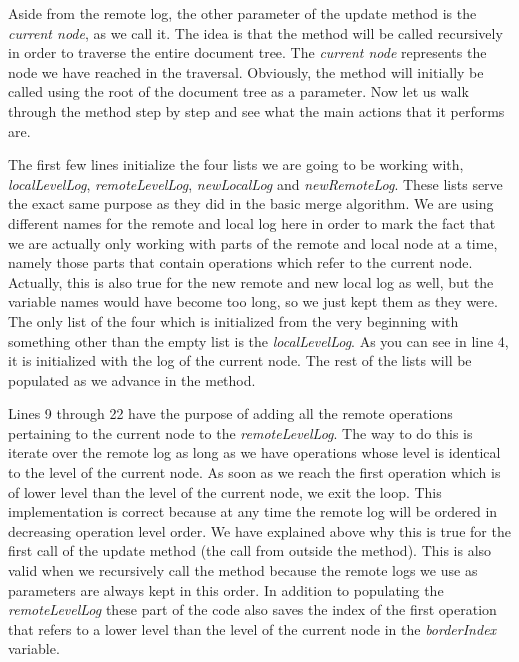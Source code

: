 Aside from the remote log, the other parameter of the update method is the \emph{current node}, as we
call it. The idea is that the method will be called recursively in order to traverse the entire
document tree. The \emph{current node} represents the node we have reached in the traversal. Obviously, the
method will initially be called using the root of the document tree as a parameter. Now let us walk through
the method step by step and see what the main actions that it performs are.

The first few lines initialize the four lists we are going to be working with, \emph{localLevelLog},
\emph{remoteLevelLog}, \emph{newLocalLog} and \emph{newRemoteLog}. These lists serve the exact same
purpose as they did in the basic merge algorithm. We are using different names for the remote and local
log here in order to mark the fact that we are actually only working with parts of the remote and local
node at a time, namely those parts that contain operations which refer to the current node. Actually, this
is also true for the new remote and new local log as well, but the variable names would have become too
long, so we just kept them as they were. The only list of the four which is initialized from the very
beginning with something other than the empty list is the \emph{localLevelLog}. As you can see in line
4, it is initialized with the log of the current node. The rest of the lists will be populated as we
advance in the method.

Lines 9 through 22 have the purpose of adding all the remote operations pertaining to the current node
to the \emph{remoteLevelLog}. The way to do this is iterate over the remote log as long as we have
operations whose level is identical to the level of the current node. As soon as we reach the first
operation which is of lower level than the level of the current node, we exit the loop. This implementation
is correct because at any time the remote log will be ordered in decreasing operation level order.
We have explained above why this is true for the first call of the update method (the call from outside
the method). This is also valid when we recursively call the method because the remote logs we
use as parameters are always kept in this order. In addition to populating the \emph{remoteLevelLog}
these part of the code also saves the index of the first operation that refers to a lower level than
the level of the current node in the \emph{borderIndex} variable.


